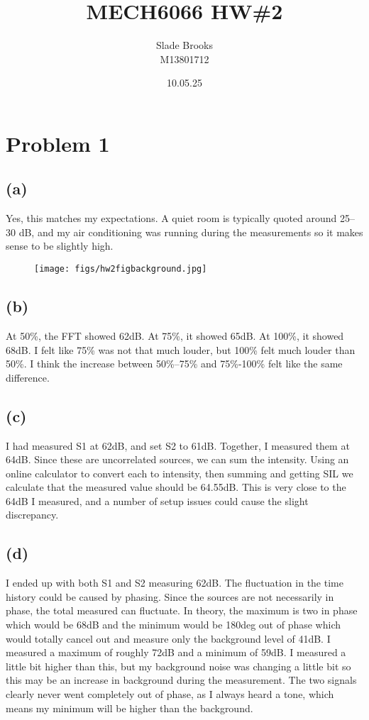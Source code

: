 \documentclass[12 pt]{article}
\title{MECH6066 HW\#2}
\date{10.05.25}
\author{Slade Brooks \\ M13801712}
\begin{document}
\maketitle

\section*{Problem 1}
\subsection*{(a)}
Yes, this matches my expectations. A quiet room is typically quoted around 25--30 dB, and my air conditioning was
running during the measurements so it makes sense to be slightly high.
\begin{figure}[H]
    \centering
    \texttt{[image: figs/hw2figbackground.jpg]}
\end{figure} \par

\subsection*{(b)}
At 50\%, the FFT showed 62dB. At 75\%, it showed 65dB. At 100\%, it showed 68dB. I felt like 75\% was not that much
louder, but 100\% felt much louder than 50\%. I think the increase between 50\%--75\% and 75\%-100\% felt like the same
difference.

\subsection*{(c)}
I had measured S1 at 62dB, and set S2 to 61dB. Together, I measured them at 64dB. Since these are uncorrelated sources,
we can sum the intensity. Using an online calculator to convert each to intensity, then summing and getting SIL we
calculate that the measured value should be 64.55dB. This is very close to the 64dB I measured, and a number of setup
issues could cause the slight discrepancy.

\subsection*{(d)}
I ended up with both S1 and S2 measuring 62dB. The fluctuation in the time history could be caused by phasing. Since the
sources are not necessarily in phase, the total measured can fluctuate. In theory, the maximum is two in phase which
would be 68dB and the minimum would be 180deg out of phase which would totally cancel out and measure only the
background level of 41dB. I measured a maximum of roughly 72dB and a minimum of 59dB. I measured a little bit higher
than this, but my background noise was changing a little bit so this may be an increase in background during the
measurement. The two signals clearly never went completely out of phase, as I always heard a tone, which means my
minimum will be higher than the background.
\end{document}
